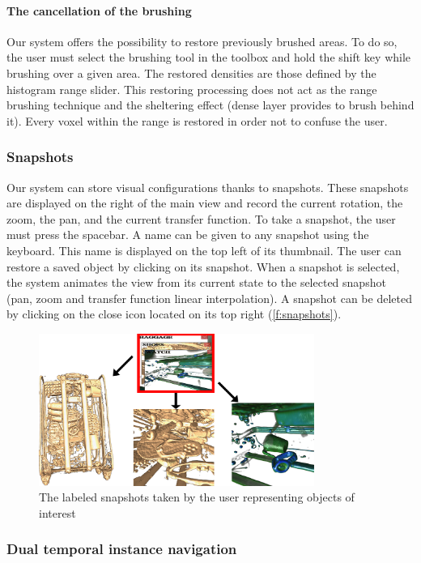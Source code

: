 \paragraph{The cancellation of the brushing}
Our system offers the possibility to restore previously brushed areas. To do so, the user must select the brushing tool in the toolbox and hold the shift key while brushing over a given area. The restored densities are those defined by the histogram range slider. This restoring processing does not act as the range brushing technique and the sheltering effect (dense layer provides to brush behind it). Every voxel within the range is restored in order not to confuse the user.

\subsubsection{Snapshots}
Our system can store visual configurations thanks to snapshots. These snapshots are displayed on the right of the main view and record the current rotation, the zoom, the pan, and the current transfer function.
To take a snapshot, the user must press the spacebar. A name can be given to any snapshot using the keyboard. This name is displayed on the top left of its thumbnail. The user can restore a saved object by clicking on its snapshot. When a snapshot is selected, the system animates the view from its current state to the selected snapshot (pan, zoom and transfer function linear interpolation). A snapshot can be deleted by clicking on the close icon located on its top right (\autoref{f:snapshots}).
 \begin{figure}
 \centering
	\includegraphics[width=9cm]{Figures/snapshots.png}
	\caption{ The labeled snapshots taken by the user representing objects of interest}
	\label{f:snapshots}
\end{figure}

\subsubsection{Dual temporal instance navigation}

